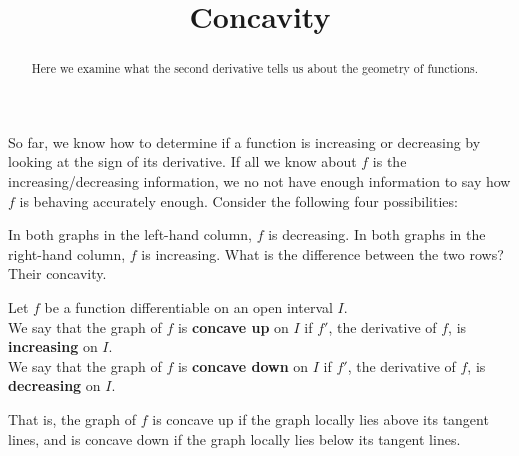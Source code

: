 \documentclass{ximera}
\title[Dig-In:]{Concavity}
\begin{document}
\begin{abstract}
  Here we examine what the second derivative tells us about the
  geometry of functions.
\end{abstract}
\maketitle


So far, we know how to determine if a function is increasing or decreasing by looking at the sign of its
derivative.  If all we know about $f$ is the increasing/decreasing information, we no not have enough
information to say how $f$ is behaving accurately enough.  Consider the following four possibilities:

\begin{image}
\end{image}

In both graphs in the left-hand column, $f$ is decreasing.  In both graphs in the right-hand column,
$f$ is increasing.  What is the difference between the two rows?  Their concavity.
\begin{definition}
	Let $f$ be a  function differentiable on an open interval $I$.\\
		We say that the graph of  $f$ is \textbf{concave up} on $I$ if  $f'$, the derivative of $f$, is \textbf{increasing} on $I$.\\
		We say that the graph of  $f$ is \textbf{concave down} on $I$ if $f'$, the derivative of $f$, is \textbf{decreasing} on $I$.
\end{definition}
That is, the graph of $f$ is concave up if the graph locally lies above its tangent lines, and is concave down if the graph locally lies below its tangent lines.
\end{document}
